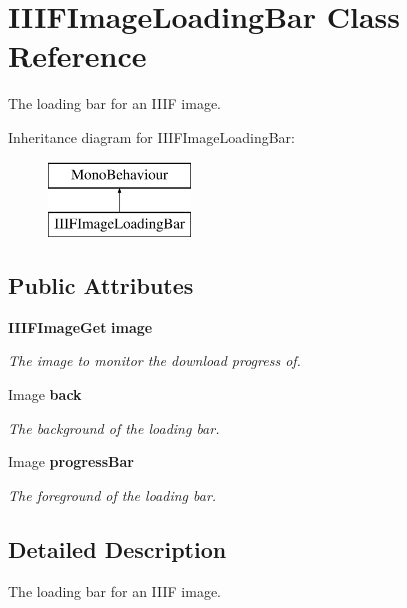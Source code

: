 \section{I\+I\+I\+F\+Image\+Loading\+Bar Class Reference}
\label{class_i_i_i_f_image_loading_bar}


The loading bar for an I\+I\+IF image.  


Inheritance diagram for I\+I\+I\+F\+Image\+Loading\+Bar\+:\begin{figure}[H]
\begin{center}
\leavevmode
\includegraphics[height=2.000000cm]{class_i_i_i_f_image_loading_bar}
\end{center}
\end{figure}
\subsection*{Public Attributes}
\begin{DoxyCompactItemize}
\item 
{\bf I\+I\+I\+F\+Image\+Get} {\bf image}
\begin{DoxyCompactList}\small\item\em The image to monitor the download progress of. \end{DoxyCompactList}\item 
Image {\bf back}
\begin{DoxyCompactList}\small\item\em The background of the loading bar. \end{DoxyCompactList}\item 
Image {\bf progress\+Bar}
\begin{DoxyCompactList}\small\item\em The foreground of the loading bar. \end{DoxyCompactList}\end{DoxyCompactItemize}


\subsection{Detailed Description}
The loading bar for an I\+I\+IF image. 



